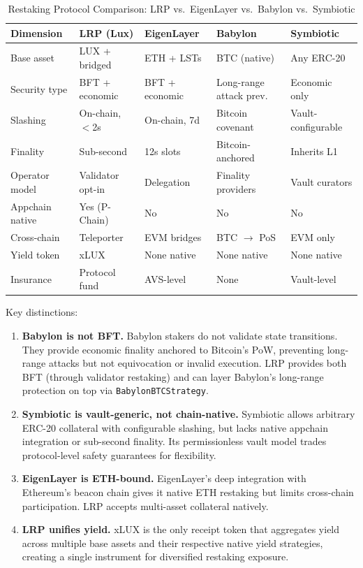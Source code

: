 \documentclass[11pt]{article}
\begin{document}
\begin{table}[H]
\centering
\caption{Restaking Protocol Comparison: LRP vs.\ EigenLayer vs.\ Babylon vs.\ Symbiotic}
\label{tab:multicompare}
\begin{tabular}{p{2.8cm}p{2.6cm}p{2.6cm}p{2.6cm}p{2.6cm}}
\toprule
\textbf{Dimension} & \textbf{LRP (Lux)} & \textbf{EigenLayer} & \textbf{Babylon} & \textbf{Symbiotic} \\
\midrule
Base asset & LUX + bridged & ETH + LSTs & BTC (native) & Any ERC-20 \\
Security type & BFT + economic & BFT + economic & Long-range attack prev. & Economic only \\
Slashing & On-chain, $<$2s & On-chain, 7d & Bitcoin covenant & Vault-configurable \\
Finality & Sub-second & 12s slots & Bitcoin-anchored & Inherits L1 \\
Operator model & Validator opt-in & Delegation & Finality providers & Vault curators \\
Appchain native & Yes (P-Chain) & No & No & No \\
Cross-chain & Teleporter & EVM bridges & BTC $\to$ PoS & EVM only \\
Yield token & xLUX & None native & None native & None native \\
Insurance & Protocol fund & AVS-level & None & Vault-level \\
\bottomrule
\end{tabular}
\end{table}

Key distinctions:

\begin{enumerate}[leftmargin=1.5em]
  \item \textbf{Babylon is not BFT.}  Babylon stakers do not validate state transitions.
    They provide economic finality anchored to Bitcoin's PoW, preventing long-range attacks
    but not equivocation or invalid execution.  LRP provides both BFT (through validator
    restaking) and can layer Babylon's long-range protection on top via
    \texttt{BabylonBTCStrategy}.
  \item \textbf{Symbiotic is vault-generic, not chain-native.}  Symbiotic allows arbitrary
    ERC-20 collateral with configurable slashing, but lacks native appchain integration or
    sub-second finality.  Its permissionless vault model trades protocol-level safety
    guarantees for flexibility.
  \item \textbf{EigenLayer is ETH-bound.}  EigenLayer's deep integration with Ethereum's
    beacon chain gives it native ETH restaking but limits cross-chain participation.
    LRP accepts multi-asset collateral natively.
  \item \textbf{LRP unifies yield.}  xLUX is the only receipt token that aggregates yield
    across multiple base assets and their respective native yield strategies, creating a
    single instrument for diversified restaking exposure.
\end{enumerate}
\end{document}
